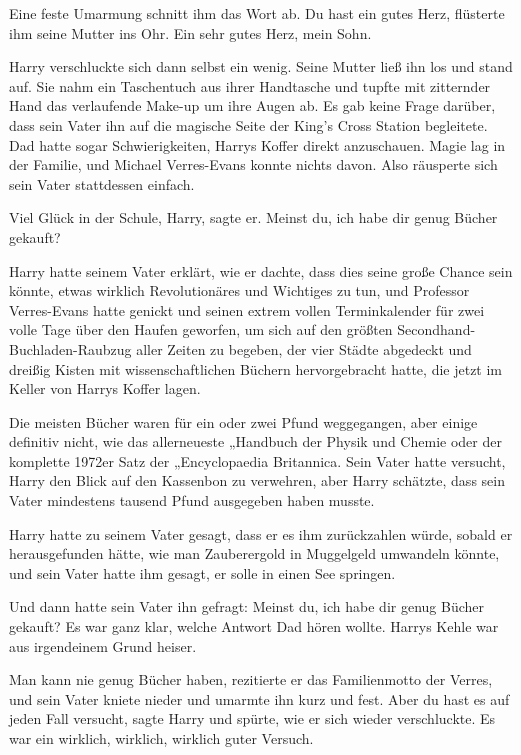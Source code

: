 Eine feste Umarmung schnitt ihm das Wort ab. \glqq Du hast ein gutes
Herz\grqq{}, flüsterte ihm seine Mutter ins Ohr. \glqq Ein sehr gutes Herz, mein
Sohn.\grqq{}

Harry verschluckte sich dann selbst ein wenig. Seine Mutter ließ ihn los und
stand auf. Sie nahm ein Taschentuch aus ihrer Handtasche und tupfte mit
zitternder Hand das verlaufende Make-up um ihre Augen ab. Es gab keine Frage
darüber, dass sein Vater ihn auf die magische Seite der King's Cross Station
begleitete. Dad hatte sogar Schwierigkeiten, Harrys Koffer direkt anzuschauen.
Magie lag in der Familie, und Michael Verres-Evans konnte nichts davon. Also
räusperte sich sein Vater stattdessen einfach.

\glqq Viel Glück in der Schule, Harry\grqq{}, sagte er. \glqq Meinst du, ich
habe dir genug Bücher gekauft?\grqq{}

Harry hatte seinem Vater erklärt, wie er dachte, dass dies seine große Chance
sein könnte, etwas wirklich Revolutionäres und Wichtiges zu tun, und Professor
Verres-Evans hatte genickt und seinen extrem vollen Terminkalender für zwei
volle Tage über den Haufen geworfen, um sich auf den größten
Secondhand-Buchladen-Raubzug aller Zeiten zu begeben, der vier Städte abgedeckt
und dreißig Kisten mit wissenschaftlichen Büchern hervorgebracht hatte, die
jetzt im Keller von Harrys Koffer lagen.

Die meisten Bücher waren für ein oder zwei Pfund weggegangen, aber einige
definitiv nicht, wie das allerneueste „Handbuch der Physik und Chemie\grqq{}
oder der komplette 1972er Satz der „Encyclopaedia Britannica\grqq{}. Sein Vater
hatte versucht, Harry den Blick auf den Kassenbon zu verwehren, aber Harry
schätzte, dass sein Vater mindestens tausend Pfund ausgegeben haben musste.

Harry hatte zu seinem Vater gesagt, dass er es ihm zurückzahlen würde, sobald er
herausgefunden hätte, wie man Zauberergold in Muggelgeld umwandeln könnte, und
sein Vater hatte ihm gesagt, er solle in einen See springen.

Und dann hatte sein Vater ihn gefragt: Meinst du, ich habe dir genug Bücher
gekauft? Es war ganz klar, welche Antwort Dad hören wollte. Harrys Kehle war aus
irgendeinem Grund heiser.

\glqq Man kann nie genug Bücher haben\grqq{}, rezitierte er das Familienmotto
der Verres, und sein Vater kniete nieder und umarmte ihn kurz und fest. \glqq
Aber du hast es auf jeden Fall versucht\grqq{}, sagte Harry und spürte, wie er
sich wieder verschluckte. \glqq Es war ein wirklich, wirklich, wirklich guter
Versuch.\grqq{}

